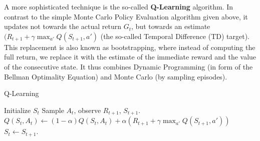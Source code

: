 A more sophisticated technique is the so-called \textbf{Q-Learning} algorithm. In contrast to the simple Monte Carlo Policy Evaluation algorithm given above, it updates not towards the actual return $G_t$, but towards an estimate $(R_{t+1} + \gamma \max_{a'} Q(S_{t+1},a')$ (the so-called Temporal Difference (TD) target). This replacement is also known as bootstrapping, where instead of computing the full return, we replace it with the estimate of the immediate reward and the value of the consecutive state. It thus combines Dynamic Programming (in form of the Bellman Optimality Equation) and Monte Carlo (by sampling episodes).

\begin{algorithm}[h!]
\label{algo:q-learning}
   \caption{Q-Learning}
\begin{algorithmic}[1]
\STATE Initialize $S_t$
\STATE Sample $A_t$, observe $R_{t+1}$, $S_{t+1}$.
\STATE $Q(S_t,A_t) \leftarrow (1 - \alpha) Q(S_t,A_t) + \alpha (R_{t+1} + \gamma \max_{a'} Q(S_{t+1},a'))$
\STATE $S_t \leftarrow S_{t+1}$.
\ENDFOR
	\ENDFOR
\end{algorithmic}
\end{algorithm}

